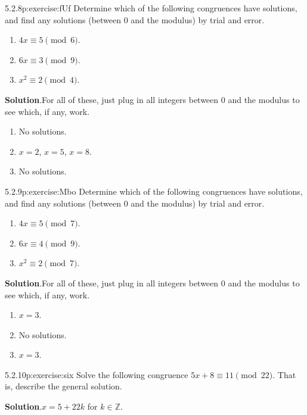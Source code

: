\documentclass[twoside,11pt,]{book}
\newcommand{\blocktitlefont}{\relax}
\numberwithin{equation}{chapter}
\newcommand{\Z}{\mathbb Z}
\begin{document}
\begin{divisionsolution}{5.2.8}{}{p:exercise:fUf}%
Determine which of the following congruences have solutions, and find any solutions (between 0 and the modulus) by trial and error.%
\begin{enumerate}[label=(\alph*)]
\item{}\(4x \equiv 5 \pmod 6\).%
\item{}\(6x \equiv 3 \pmod 9\).%
\item{}\(x^2 \equiv 2 \pmod 4\).%
\end{enumerate}
%
\par\smallskip%
\noindent\textbf{\blocktitlefont Solution}.\quad{}For all of these, just plug in all integers between 0 and the modulus to see which, if any, work.%
\begin{enumerate}[label=(\alph*)]
\item{}No solutions.%
\item{}\(x = 2\), \(x = 5\), \(x = 8\).%
\item{}No solutions.%
\end{enumerate}
%
\end{divisionsolution}%
\begin{divisionsolution}{5.2.9}{}{p:exercise:Mbo}%
Determine which of the following congruences have solutions, and find any solutions (between 0 and the modulus) by trial and error.%
\begin{enumerate}[label=(\alph*)]
\item{}\(4x \equiv 5 \pmod 7\).%
\item{}\(6x \equiv 4 \pmod 9\).%
\item{}\(x^2 \equiv 2 \pmod 7\).%
\end{enumerate}
%
\par\smallskip%
\noindent\textbf{\blocktitlefont Solution}.\quad{}For all of these, just plug in all integers between 0 and the modulus to see which, if any, work.%
\begin{enumerate}[label=(\alph*)]
\item{}\(x = 3\).%
\item{}No solutions.%
\item{}\(x = 3\).%
\end{enumerate}
%
\end{divisionsolution}%
\begin{divisionsolution}{5.2.10}{}{p:exercise:six}%
Solve the following congruence \(5x + 8 \equiv 11 \pmod{22}\).  That is, describe the general solution.%
\par\smallskip%
\noindent\textbf{\blocktitlefont Solution}.\quad{}\(x = 5+22k\) for \(k \in \Z\).%
\end{divisionsolution}%
\end{document}
